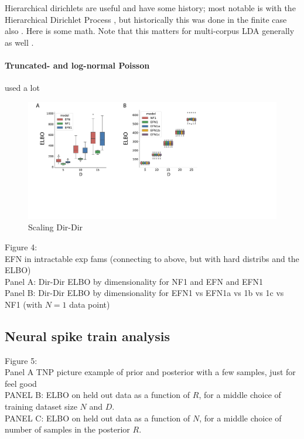 \documentclass{article}
\begin{document}
Hierarchical dirichlets are useful and have some history; most notable is with the  Hierarchical Dirichlet Process \cite{teh2006hdp}, but historically this was done in the finite case also \cite{mackay1995hierarchical}.  Here is some math.    Note that this matters for multi-corpus LDA generally as well \cite{blei2003latent, pritchard2000inference}.


\paragraph{Truncated- and log-normal Poisson}

used a lot \cite{gao2016linear}\cite{adams2009tractable}\cite{cunningham2008fast,cunningham2008inferring}


 \begin{figure}
  \centering
\includegraphics[scale=0.46]{figs/fig4/fig4.pdf}
  \caption{Scaling Dir-Dir}
\end{figure}



Figure 4: \\
EFN in intractable exp fams (connecting to above, but with hard distribs and the ELBO) \\
Panel A: Dir-Dir ELBO by dimensionality for NF1 and EFN and EFN1\\
Panel B: Dir-Dir ELBO by dimensionality for EFN1 vs EFN1a vs 1b vs 1c vs NF1 (with $N=1$ data point)\\


\subsection{Neural spike train analysis}

Figure 5: \\
Panel A TNP picture example of prior and posterior with a few samples, just for feel good  \\
PANEL B: ELBO on held out data as a function of $R$, for a middle choice of training dataset size $N$ and $D$. \\ 
PANEL C: ELBO on held out data as a function of $N$, for a middle choice of number of samples in the posterior $R$. \\
\end{document}
